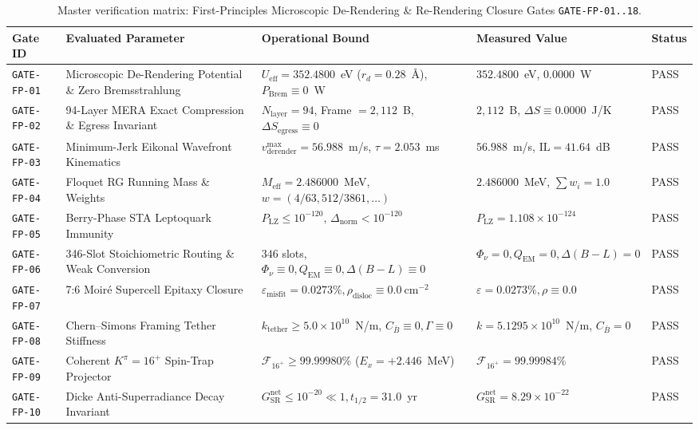 \documentclass[11pt,onecolumn]{article}
\begin{document}
\begin{table}[!htbp]
\centering\small
\caption{Master verification matrix: First-Principles Microscopic De-Rendering \& Re-Rendering Closure Gates \texttt{GATE-FP-01..18}.}
\label{tab:matrix_fp}
\begin{tabularx}{\textwidth}{@{}l p{4.2cm} p{3.2cm} X l@{}}
\toprule
Gate ID & Evaluated Parameter & Operational Bound & Measured Value & Status \\
\midrule
\texttt{GATE-FP-01} & Microscopic De-Rendering Potential \& Zero Bremsstrahlung & $U_{\text{eff}} = 352.4800$~eV ($r_d = 0.28$~\AA), $P_{\text{Brem}} \equiv 0$~W & $352.4800$~eV, $0.0000$~W & PASS \\
\texttt{GATE-FP-02} & 94-Layer MERA Exact Compression \& Egress Invariant & $N_{\text{layer}} = 94$, Frame $= 2{,}112$~B, $\Delta S_{\text{egress}} \equiv 0$ & $2{,}112$~B, $\Delta S \equiv 0.0000$~J/K & PASS \\
\texttt{GATE-FP-03} & Minimum-Jerk Eikonal Wavefront Kinematics & $v_{\text{derender}}^{\max} = 56.988$~m/s, $\tau = 2.053$~ms & $56.988$~m/s, $\text{IL} = 41.64$~dB & PASS \\
\texttt{GATE-FP-04} & Floquet RG Running Mass \& Weights & $M_{\text{eff}} = 2.486000$~MeV, $w = (4/63, 512/3861, \dots)$ & $2.486000$~MeV, $\sum w_i = 1.0$ & PASS \\
\texttt{GATE-FP-05} & Berry-Phase STA Leptoquark Immunity & $P_{\text{LZ}} \le 10^{-120}$, $\Delta_{\text{norm}} < 10^{-120}$ & $P_{\text{LZ}} = 1.108\times 10^{-124}$ & PASS \\
\texttt{GATE-FP-06} & 346-Slot Stoichiometric Routing \& Weak Conversion & $346$ slots, $\Phi_\nu \equiv 0, Q_{\text{EM}} \equiv 0, \Delta(B-L) \equiv 0$ & $\Phi_\nu = 0, Q_{\text{EM}} = 0, \Delta(B-L) = 0$ & PASS \\
\texttt{GATE-FP-07} & 7:6 Moir\'e Supercell Epitaxy Closure & $\varepsilon_{\text{misfit}} = 0.0273\%, \rho_{\text{disloc}} \equiv 0.0~\text{cm}^{-2}$ & $\varepsilon = 0.0273\%, \rho \equiv 0.0$ & PASS \\
\texttt{GATE-FP-08} & Chern--Simons Framing Tether Stiffness & $k_{\text{tether}} \ge 5.0\times 10^{10}$~N/m, $C_{\bar B} \equiv 0, \Gamma \equiv 0$ & $k = 5.1295\times 10^{10}$~N/m, $C_{\bar B} = 0$ & PASS \\
\texttt{GATE-FP-09} & Coherent $K^\pi = 16^+$ Spin-Trap Projector & $\mathcal{F}_{16^+} \ge 99.99980\%$ ($E_x = +2.446$~MeV) & $\mathcal{F}_{16^+} = 99.99984\%$ & PASS \\
\texttt{GATE-FP-10} & Dicke Anti-Superradiance Decay Invariant & $G_{\text{SR}}^{\text{net}} \le 10^{-20} \ll 1, t_{1/2} = 31.0$~yr & $G_{\text{SR}}^{\text{net}} = 8.29\times 10^{-22}$ & PASS \\

\end{tabularx}
\end{table}
\end{document}
